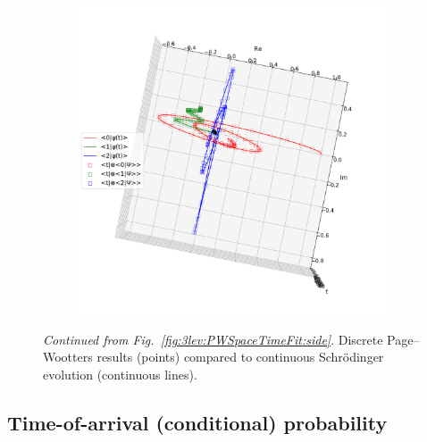 \begin{figure}[p]\ContinuedFloat %
  \begin{fullpage}
    \begin{subfigure}{\textwidth}
      \includegraphics[width=\textwidth]{img/3ldetect/PWSpaceTimeFit_top.pdf}
      \label{fig:3lev:PWSpaceTimeFit:top}
    \end{subfigure}
    \caption{
      \textit{Continued from Fig.~\ref{fig:3lev:PWSpaceTimeFit:side}}.
      Discrete Page--Wootters results (points)
      compared to continuous
      Schr\"{o}dinger
      evolution (continuous lines).
    }
  \end{fullpage}
\end{figure}

\subsection{Time-of-arrival (conditional) probability}

